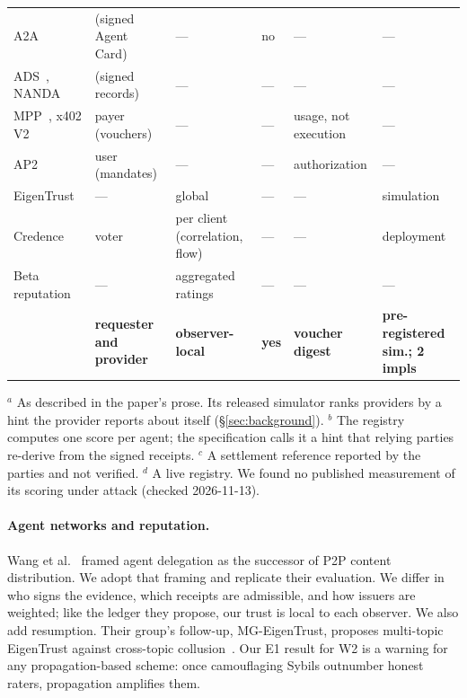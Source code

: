 \begin{table}[t]
\begin{tabular}{@{}lllllp{3.2cm}@{}}
\midrule
A2A~\cite{a2a2026} & (signed Agent Card) & --- & no & --- & --- \\
ADS~\cite{ads2026}, NANDA~\cite{nanda2025} & (signed records) & --- & --- & --- & --- \\
MPP~\cite{mpp2026}, x402 V2~\cite{x402v2} & payer (vouchers) & --- & --- & usage, not execution & --- \\
AP2~\cite{ap2} & user (mandates) & --- & --- & authorization & --- \\
\midrule
EigenTrust~\cite{kamvar2003eigentrust} & --- & global & --- & --- & simulation \\
Credence~\cite{walsh2006credence} & voter & per client (correlation, flow) & --- & --- & deployment \\
Beta reputation~\cite{josang2002beta} & --- & aggregated ratings & --- & --- & --- \\
\midrule
\textbf{\sys{}} & \textbf{requester and provider} & \textbf{observer-local} & \textbf{yes} & \textbf{voucher digest} & \textbf{pre-registered sim.; 2 impls} \\
\bottomrule
\end{tabular}

\smallskip
\raggedright\footnotesize $^{a}$ As described in the paper's prose. Its
released simulator ranks providers by a hint the provider reports about
itself (\S\ref{sec:background}).
$^{b}$ The registry computes one score per agent; the specification calls
it a hint that relying parties re-derive from the signed receipts.
$^{c}$ A settlement reference reported by the parties and not verified.
$^{d}$ A live registry. We found no published measurement of its scoring
under attack (checked 2026-11-13).
\end{table}

\paragraph{Agent networks and reputation.}
Wang et al.~\cite{wang2026agenticp2p} framed agent delegation as the
successor of P2P content distribution. We adopt that framing and
replicate their evaluation. We differ in who signs the evidence, which
receipts are admissible, and how issuers are weighted; like the ledger
they propose, our trust is local to each observer. We also add
resumption. Their group's follow-up,
MG-EigenTrust, proposes multi-topic EigenTrust against cross-topic
collusion~\cite{zhang2026distributed}. Our E1 result for W2 is a warning
for any propagation-based scheme: once camouflaging Sybils outnumber
honest raters, propagation amplifies them.

